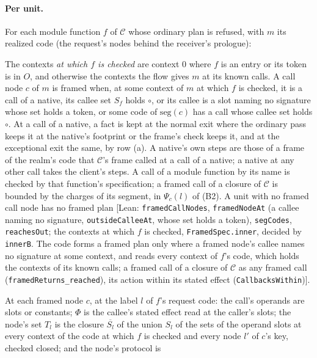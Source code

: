 \documentclass[10pt,a4paper]{article}
\theoremstyle{definition}
\theoremstyle{remark}
\newcommand{\lean}[1]{\texttt{\small #1}}
\newcommand{\status}[1]{\textsf{\small[#1]}}
\newcommand{\cC}{\mathcal{C}}
\begin{document}
\paragraph{Per unit.} For each module function $f$ of $\cC$ whose
ordinary plan is refused, with $m$ its realized code (the request's nodes
behind the receiver's prologue):
\begin{description}[leftmargin=1.5em,style=nextline]
\item[(B1) Framed call nodes] The contexts \emph{at which $f$ is
checked} are context $0$ where $f$ is an entry or its token is in $O$,
and otherwise the contexts the flow gives $m$ at its known calls. A call
node $c$ of $m$ is framed when, at some context of $m$ at which $f$ is
checked, it is a call of a native, its callee set $S_f$ holds $\circ$,
or its callee is a slot
naming no signature whose set holds a token, or some
code of $\mathrm{seg}(c)$ has a call whose callee set holds $\circ$. At
a call of a native, a fact is kept at the normal exit where the ordinary
pass keeps it at the native's footprint or the frame's check keeps it,
and at the exceptional exit the same, by row (a). A native's own steps
are those of a frame of the realm's code that $\cC$'s frame called at a call of a native; a
native at any other call takes the client's steps. A
call of a module function by its name is checked by that function's
specification; a framed call of a closure of $\cC$ is bounded by the
charges of its segment, in $\Psi_c(l)$ of (B2). A unit with no framed
call node has no framed plan
\status{Lean: \lean{framedCallNodes}, \lean{framedNodeAt} (a callee naming no signature, \lean{outsideCalleeAt}, whose set holds a token), \lean{segCodes}, \lean{reachesOut}; the contexts at which $f$ is checked, \lean{FramedSpec.inner}, decided by \lean{innerB}. The code forms a framed plan only where a framed node's callee names no signature at some context, and reads every context of $f$'s code, which holds the contexts of its known calls; a framed call of a closure of $\cC$ as any framed call (\lean{framedReturns\_reached}), its action within its stated effect (\lean{CallbacksWithin})}.
\item[(B2) Kept facts] At each framed node $c$, at the label $l$ of
$f$'s request code: the call's operands are slots or constants; $\Phi$ is
the callee's stated effect read at the caller's slots; the node's set
$T_l$ is the closure $\overline{S_l}$ of the union $S_l$ of the sets of
the operand slots at every context of the code at which $f$ is checked
and every node $l'$ of $c$'s key, checked closed; and the node's protocol is

\end{description}
\end{document}
